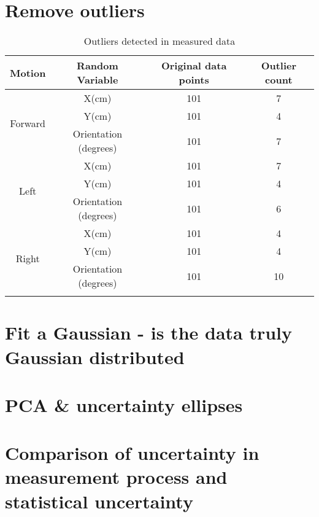    \section{Remove outliers}
    
    \begin{table}[]
    \begin{tabular}{|c|c|c|c|}
    \hline
    \textbf{Motion}          & \textbf{Random Variable} & \textbf{Original data points} & \textbf{Outlier count} \\ \hline
    \multirow{3}{*}{Forward} & X(cm)                    & 101                           & 7                      \\ \cline{2-4} 
                             & Y(cm)                    & 101                           & 4                      \\ \cline{2-4} 
                             & Orientation (degrees)           & 101                           & 7                      \\ \hline
    \multirow{3}{*}{Left}    & X(cm)                    & 101                           & 7                      \\ \cline{2-4} 
                             & Y(cm)                    & 101                           & 4                      \\ \cline{2-4} 
                             & Orientation (degrees)           & 101                           & 6                      \\ \hline
    \multirow{3}{*}{Right}   & X(cm)                    & 101                           & 4                      \\ \cline{2-4} 
                             & Y(cm)                    & 101                           & 4                      \\ \cline{2-4} 
                             & Orientation (degrees)           & 101                           & 10                     \\ \hline
    \caption{{Outliers detected in measured data}}
    \label{tab: right-run}
    \end{tabular}
    \end{table}
    
    \section{Fit a Gaussian - is the data truly Gaussian distributed}
    
    \section{PCA \& uncertainty ellipses}
     
    \section{Comparison of uncertainty in measurement process and statistical uncertainty}
     
    

    
   

        
     

   
    

